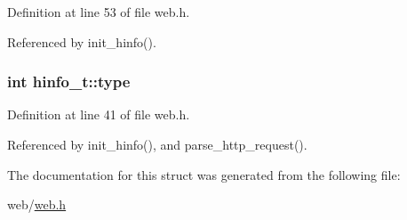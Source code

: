 Definition at line 53 of file web.\-h.



Referenced by init\-\_\-hinfo().

\hypertarget{structhinfo__t_a4e896141431943909a71282fc56799fb}{
\subsubsection[{type}]{\setlength{\rightskip}{0pt plus 5cm}int hinfo\-\_\-t\-::type}}\label{structhinfo__t_a4e896141431943909a71282fc56799fb}


Definition at line 41 of file web.\-h.



Referenced by init\-\_\-hinfo(), and parse\-\_\-http\-\_\-request().



The documentation for this struct was generated from the following file\-:\begin{DoxyCompactItemize}
\item 
web/\hyperlink{web_8h}{web.\-h}\end{DoxyCompactItemize}
